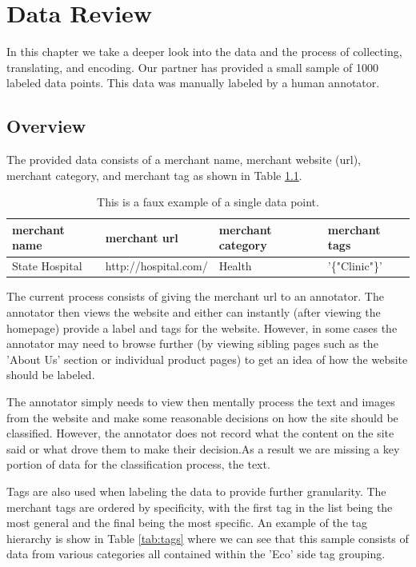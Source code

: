 \chapter{Data Review}

In this chapter we take a deeper look into the data and the process of collecting, translating, and encoding. Our partner has provided a small sample of 1000 labeled data points. This data was manually labeled by a human annotator. 

\section{Overview}

The provided data consists of a merchant name, merchant website (url), merchant category, and merchant tag as shown in Table \ref{tab:data_point}. 

\begin{table}[h]
\begin{tabular}{|l|l|l|l|}
\hline
merchant name            & merchant url            & merchant category & merchant tags           \\ \hline
State Hospital & http://hospital.com/ & Health   & '\{"Clinic"\}' \\ \hline
\end{tabular}
\caption{This is a faux example of a single data point.}
\label{tab:data_point}
\end{table}

The current process consists of giving the merchant url to an annotator. The annotator then views the website and either can instantly (after viewing the homepage) provide a label and tags for the website. However, in some cases the annotator may need to browse further (by viewing sibling pages such as the 'About Us' section or individual product pages) to get an idea of how the website should be labeled. 

The annotator simply needs to view then mentally process the text and images from the website and make some reasonable decisions on how the site should be classified. However, the annotator does not record what the content on the site said or what drove them to make their decision.As a result we are missing a key portion of data for the classification process, the text. 

Tags are also used when labeling the data to provide further granularity. The merchant tags are ordered by specificity, with the first tag in the list being the most general and the final being the most specific. An example of the tag hierarchy is show in Table \ref{tab:tags} where we can see that this sample consists of data from various categories all contained within the 'Eco' side tag grouping.


